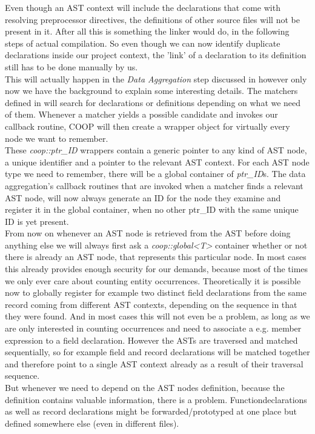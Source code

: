 Even though an AST context will include the declarations that come with resolving preprocessor directives, the definitions of other source files will not be present in it. After all this is something the linker would do, in the following steps of actual compilation. So even though we can now identify duplicate declarations inside our project context, the 'link' of a declaration to its definition still has to be done manually by us.\\
This will actually happen in the \textit{Data Aggregation} step discussed in  however only now we have the background to explain some interesting details. The matchers defined in  will search for declarations or definitions depending on what we need of them. Whenever a matcher yields a possible candidate and invokes our callback routine, COOP will then create a wrapper object for virtually every node we want to remember.\\
These \textit{coop::ptr\_ID} wrappers contain a generic pointer to any kind of AST node, a unique identifier and a pointer to the relevant AST context. For each AST node type we need to remember, there will be a global container of \textit{ptr\_ID}s. The data aggregation's callback routines that are invoked when a matcher finds a relevant AST node, will now always generate an ID for the node they examine and register it in the global container, when no other ptr\_ID with the same unique ID is yet present.\\
From now on whenever an AST node is retrieved from the AST before doing anything else we will always first ask a \textit{coop::global<T>} container whether or not there is already an AST node, that represents this particular node. In most cases this already provides enough security for our demands, because most of the times we only ever care about counting entity occurrences. Theoretically it is possible now to globally register for example two distinct field declarations from the same record coming from different AST contexts, depending on the sequence in that they were found. And in most cases this will not even be a problem, as long as we are only interested in counting occurrences and need to associate a e.g. member expression to a field declaration. However the ASTs are traversed and matched sequentially, so for example field and record declarations will be matched together and therefore point to a single AST context already as a result of their traversal sequence.\\
But whenever we need to depend on the AST nodes definition, because the definition contains valuable information, there is a problem. Functiondeclarations as well as record declarations might be forwarded/prototyped at one place but defined somewhere else (even in different files).\\\\
